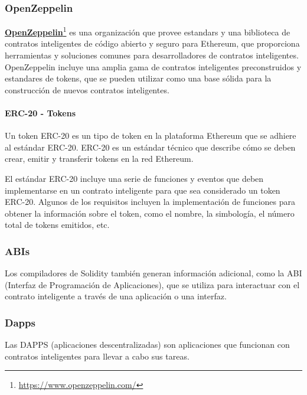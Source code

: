 \subsubsection{OpenZeppelin}

\textcolor{blue}{\href{https://www.openzeppelin.com/}{\textbf{OpenZeppelin}}}\footnote{\url{https://www.openzeppelin.com/}} es una organización que provee estandars y una biblioteca de contratos inteligentes de código abierto y seguro para Ethereum, que proporciona herramientas y soluciones comunes para desarrolladores de contratos inteligentes. OpenZeppelin incluye una amplia gama de contratos inteligentes preconstruidos y estandares de tokens, que se pueden utilizar como una base sólida para la construcción de nuevos contratos inteligentes.

\paragraph{ERC-20 - Tokens}

Un token ERC-20 es un tipo de token en la plataforma Ethereum que se adhiere al estándar ERC-20. ERC-20 es un estándar técnico que describe cómo se deben crear, emitir y transferir tokens en la red Ethereum.

\bigskip

El estándar ERC-20 incluye una serie de funciones y eventos que deben implementarse en un contrato inteligente para que sea considerado un token ERC-20. Algunos de los requisitos incluyen la implementación de funciones para obtener la información sobre el token, como el nombre, la simbología, el número total de tokens emitidos, etc.

\subsubsection{ABIs}

Los compiladores de Solidity también generan información adicional, como la ABI (Interfaz de Programación de Aplicaciones), que se utiliza para interactuar con el contrato inteligente a través de una aplicación o una interfaz.

\subsubsection{Dapps}

Las DAPPS (aplicaciones descentralizadas) son aplicaciones que funcionan con contratos inteligentes para llevar a cabo sus tareas.

